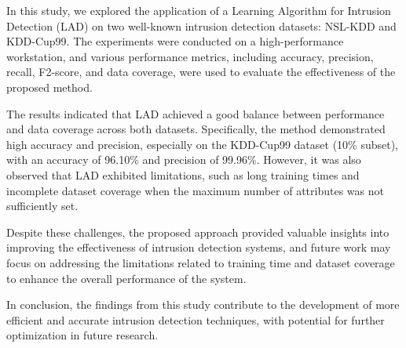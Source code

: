 \documentclass[pdflatex,sn-mathphys-num]{sn-jnl}%
\theoremstyle{thmstyleone}%
\theoremstyle{thmstyletwo}%
\theoremstyle{thmstylethree}%
\begin{document}
In this study, we explored the application of a Learning Algorithm for Intrusion Detection (LAD) on two well-known intrusion detection datasets: NSL-KDD and KDD-Cup99. The experiments were conducted on a high-performance workstation, and various performance metrics, including accuracy, precision, recall, F2-score, and data coverage, were used to evaluate the effectiveness of the proposed method. 

The results indicated that LAD achieved a good balance between performance and data coverage across both datasets. Specifically, the method demonstrated high accuracy and precision, especially on the KDD-Cup99 dataset (10\% subset), with an accuracy of 96.10\% and precision of 99.96\%. However, it was also observed that LAD exhibited limitations, such as long training times and incomplete dataset coverage when the maximum number of attributes was not sufficiently set.

Despite these challenges, the proposed approach provided valuable insights into improving the effectiveness of intrusion detection systems, and future work may focus on addressing the limitations related to training time and dataset coverage to enhance the overall performance of the system. 

In conclusion, the findings from this study contribute to the development of more efficient and accurate intrusion detection techniques, with potential for further optimization in future research.







\end{document}
